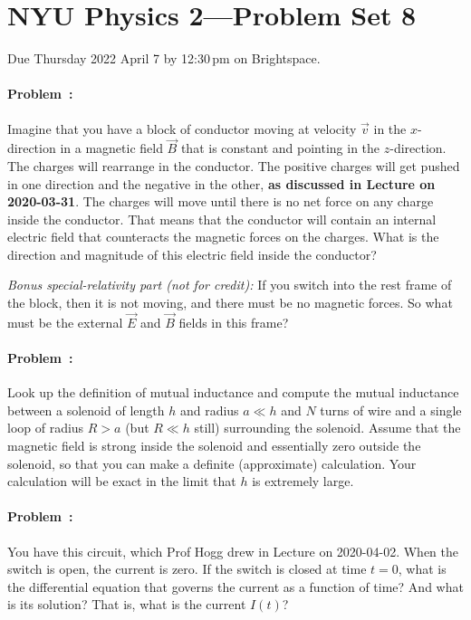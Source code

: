\documentclass[12pt]{article}
\begin{document}
\section*{NYU Physics 2---Problem Set 8}

Due Thursday 2022 April 7 by 12:30\,pm on Brightspace.

\paragraph{Problem~\theproblem:}%
Imagine that you have a block of conductor moving at velocity
$\vec{v}$ in the $x$-direction in a magnetic field $\vec{B}$ that is
constant and pointing in the $z$-direction. The charges will rearrange
in the conductor. The positive charges will get pushed in one
direction and the negative in the other, \textbf{as discussed in Lecture on
2020-03-31}. The charges will move until there is no net force on any
charge inside the conductor. That means that the conductor will
contain an internal electric field that counteracts the magnetic
forces on the charges. What is the direction and magnitude of this
electric field inside the conductor?

\textsl{Bonus special-relativity part (not for credit):} If you switch
into the rest frame of the block, then it is not moving, and there
must be no magnetic forces. So what must be the external $\vec{E}$ and
$\vec{B}$ fields in this frame?

\paragraph{Problem~\theproblem:}%
Look up the definition of mutual inductance and compute the mutual
inductance between a solenoid of length $h$ and radius $a\ll h$ and
$N$ turns of wire and a single loop of radius $R>a$ (but $R\ll h$
still) surrounding the solenoid. Assume that the magnetic field is
strong inside the solenoid and essentially zero outside the solenoid,
so that you can make a definite (approximate) calculation. Your
calculation will be exact in the limit that $h$ is extremely large.

\paragraph{Problem~\theproblem:}%
You have this circuit, which Prof Hogg drew in Lecture on 2020-04-02.
When the switch is open, the current is zero. If the switch is closed
at time $t=0$, what is the differential equation that governs the
current as a function of time? And what is its solution? That is,
what is the current $I(t)$?
\end{document}
